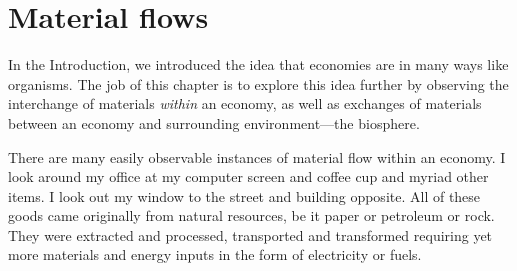 %
%
%
\chapter{Material flows}
\label{chap:materials} 




In the Introduction, we introduced the idea that economies are
in many ways like organisms. The job of this chapter is to explore
this idea further by observing the interchange of materials \emph{within}
an economy, as well as exchanges of materials between an economy and 
surrounding environment---the biosphere.

There are many easily observable instances of material flow within an
economy. I look around my office at my computer screen and coffee cup
and myriad other items. I look out my window to the street and building
opposite. All of these goods came originally from natural resources, be it paper or
petroleum or rock. They were extracted and processed, transported and
transformed requiring yet more materials and energy inputs in the form of
electricity or fuels. 

